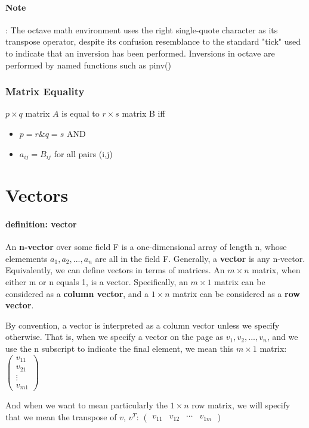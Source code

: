 \documentclass[12pt,letterpaper,final]{article}
\begin{document}
\paragraph{Note}: The octave math environment uses the right single-quote character as its transpose operator, despite its confusion resemblance to the standard "tick" used to indicate that an inversion has been performed. Inversions in octave are performed by named functions such as pinv() 

 
\subsubsection{Matrix Equality}
$p \times q$ matrix $A$ is equal to $r \times s$ matrix B iff 
\begin{itemize}
\item $p = r \& q = s$ AND
\item $a_{ij} = B_{ij}$ for all pairs (i,j)
\end{itemize}

\section{Vectors}
\paragraph{definition: vector} An \textbf{n-vector} over some field F is a one-dimensional array of length n, whose elemements $a_1, a_2, ..., a_n$ are all in the field F. Generally, a \textbf{vector} is any n-vector.  
Equivalently, we can define vectors in terms of matrices. An $m \times n$ matrix, when either m or n equals 1, is a vector. Specifically, an $m \times 1$ matrix can be considered as a \textbf{column vector}, and a $1 \times n$ matrix can be considered as a \textbf{row vector}.

By convention, a vector is interpreted as a column vector unless we specify otherwise. That is, when we specify a vector on the page as $v_1, v_2, ..., v_n$, and we use the n subscript to indicate the final element, we mean this $m \times 1$ matrix: $
 \begin{pmatrix}
  v_{11} \\
  v_{21} \\
  \vdots \\
  v_{m1} 
 \end{pmatrix}
$

And when we want to mean particularly the $1 \times n$ row matrix, we will specify that we mean the transpose of $v$, $v^T$: $
 \begin{pmatrix}
  v_{11} &  v_{12} & \cdots & v_{1m} 
 \end{pmatrix}
$
\end{document}
